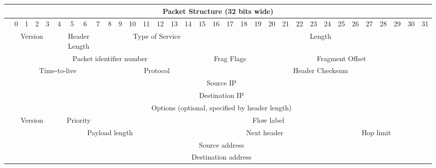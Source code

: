 \documentclass{article}
\begin{document}
\begin{tabular}{|c||c|c|c|c|c|c|c|c||c|c|c|c|c|c|c|c||c|c|c|c|c|c|c|c||c|c|c|c|c|c|c|c|}
\hline
	\multicolumn{33}{|c|}{\textbf{Packet Structure (32 bits wide)}}\\
\hline
	& 0 & 1 & 2 & 3 & 4 & 5 & 6 & 7 & 8 & 9 & 10 & 11 & 12 & 13 & 14 & 15 & 16 & 17 & 18 & 19 & 20 & 21 & 22 & 23 & 24 & 25 & 26 & 27 & 28 & 29 & 30 & 31\\
\hline
\hline
	\multirow{6}{*}{\rotatebox{90}{\textbf{IPv4}}}
		& \multicolumn{4}{|c|}{Version} & \multicolumn{4}{|c|}{Header Length} & \multicolumn{8}{|c|}{Type of Service} & \multicolumn{16}{|c|}{Length}\\
		\cline{2-33}
		& \multicolumn{16}{|c|}{Packet identifier number} & \multicolumn{3}{|c|}{Frag Flags} & \multicolumn{13}{|c|}{Fragment Offset}\\
		\cline{2-33}
		& \multicolumn{8}{|c|}{Time-to-live} & \multicolumn{8}{|c|}{Protocol} & \multicolumn{16}{|c|}{Header Checksum}\\
		\cline{2-33}
		& \multicolumn{32}{|c|}{Source IP}\\
		\cline{2-33}
		& \multicolumn{32}{|c|}{Destination IP}\\
		\cline{2-33}
		& \multicolumn{32}{|c|}{Options (optional, specified by header length)}\\
\hline
\hline
	\multirow{10}{*}{\rotatebox{90}{\textbf{IPv6}}}
		& \multicolumn{4}{|c|}{Version} & \multicolumn{4}{|c|}{Priority} & \multicolumn{24}{|c|}{Flow label}\\
		\cline{2-33}
		& \multicolumn{16}{|c|}{Payload length} & \multicolumn{8}{|c|}{Next header} & \multicolumn{8}{|c|}{Hop limit}\\
		\cline{2-33}
		& \multicolumn{32}{|c|}{\multirow{4}{*}{Source address}}\\
		& \multicolumn{32}{|c|}{}\\
		& \multicolumn{32}{|c|}{}\\
		& \multicolumn{32}{|c|}{}\\
		\cline{2-33}
		& \multicolumn{32}{|c|}{\multirow{4}{*}{Destination address}}\\
		& \multicolumn{32}{|c|}{}\\
		& \multicolumn{32}{|c|}{}\\
		& \multicolumn{32}{|c|}{}\\
\hline
\end{tabular}
\end{document}
